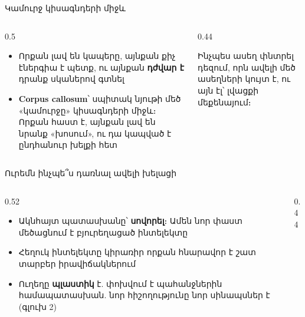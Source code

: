 \begin{frame}{Կամուրջ կիսագնդերի միջև}
  \begin{columns}[T]
    \begin{column}{0.5\textwidth}
      \begin{itemize}
        \item Որքան լավ են կապերը, այնքան քիչ էներգիա է պետք, ու այնքան \textbf{դժվար է} դրանք սկաներով գտնել
        \item<2-> \textbf{Corpus callosum}՝ սպիտակ նյութի մեծ «կամուրջը» կիսագնդերի միջև։ Որքան հաստ է, այնքան լավ են նրանք «խոսում», ու դա կապված է ընդհանուր խելքի հետ
      \end{itemize}
    \end{column}
    \begin{column}{0.44\textwidth}
      \begin{bookquote}
        Ինչպես ասեղ փնտրել դեզում, որն ավելի մեծ ասեղների կույտ է, ու այն էլ՝ լվացքի մեքենայում։
      \end{bookquote}
    \end{column}
  \end{columns}
\end{frame}

\begin{frame}{Ուրեմն ինչպե՞ս դառնալ ավելի խելացի}
  \begin{columns}[T]
    \begin{column}{0.52\textwidth}
      \begin{itemize}
        \item Ակնհայտ պատասխանը՝ \textbf{սովորել}։ Ամեն նոր փաստ մեծացնում է բյուրեղացած ինտելեկտը
        \item<2-> Հեղուկ ինտելեկտը կիրառիր որքան հնարավոր է շատ տարբեր իրավիճակներում
        \item<3-> Ուղեղը \textbf{պլաստիկ} է. փոխվում է պահանջներին համապատասխան. նոր հիշողությունը նոր սինապսներ է (գլուխ 2)
      \end{itemize}
    \end{column}
    \begin{column}{0.44\textwidth}
    \end{column}
  \end{columns}
\end{frame}

